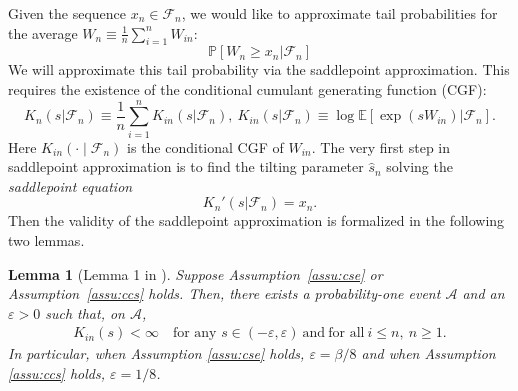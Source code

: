 \documentclass[12pt]{article}
\newtheorem{lemma}{Lemma}
\theoremstyle{definition}
\def\P{\mathbb{P}}
\def\P{\mathbb{P}}
\newcommand{\E}{\mathbb E}								%
\renewcommand{\P}{\mathbb{P}}							%
\begin{document}
Given the sequence $x_n\in\mathcal{F}_n$, we would like to approximate tail probabilities for the average $W_n\equiv \frac{1}{n}\sum_{i=1}^n W_{in}$:
\begin{equation*}
	\P[W_n\geq x_n|\mathcal{F}_n]
\end{equation*}
We will approximate this tail probability via the saddlepoint approximation. This requires the existence of the conditional cumulant generating function (CGF):
\begin{equation*}
  K_n(s|\mathcal{F}_n) \equiv \frac{1}{n}\sum_{i=1}^n K_{in}(s|\mathcal{F}_n),\ K_{in}(s|\mathcal{F}_n)\equiv \log \E[\exp(sW_{in})|\mathcal{F}_n].
\end{equation*}
Here $K_{in}(\cdot\mid\mathcal{F}_n)$ is the conditional CGF of $W_{in}$. The very first step in saddlepoint approximation is to find the tilting parameter $\hat s_n$ solving the \textit{saddlepoint equation}
\begin{equation}\label{eq:saddlepoint-equation}
	K_n'(s|\mathcal{F}_n)=x_n.
\end{equation}
Then the validity of the saddlepoint approximation is formalized in the following two lemmas.

\begin{lemma}[Lemma 1 in \cite{Niu2024}]\label{lem:finite_cgf}
  Suppose Assumption~\ref{assu:cse} or Assumption~\ref{assu:ccs} holds. Then, there exists a probability-one event $\mathcal A$ and an $\varepsilon > 0$ such that, on $\mathcal A$,
  \begin{align}
  K_{in}(s) < \infty\quad \text{for any } s\in (-\varepsilon,\varepsilon)\ \text{and}\ \text{for all}\ i \leq n,\ n \geq 1 \label{eq:finite_cgf}.
  \end{align}
  In particular, when Assumption \ref{assu:cse} holds, $\varepsilon=\beta/8$ and when Assumption \ref{assu:ccs} holds, $\varepsilon=1/8$.
  \end{lemma}
\end{document}
